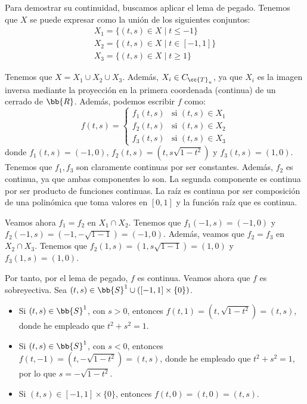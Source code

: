 \documentclass[12pt]{article}
\newcommand{\T}[0]{\cc{T}}
\begin{document}
\begin{ejercicio}[3 puntos]
\begin{enumerate}
            Para demostrar su continuidad, buscamos aplicar el lema de pegado. Tenemos que $X$ se puede expresar como la unión de los siguientes conjuntos:
            \begin{equation*}
                    \begin{array}{l}
                        X_1 = \{(t,s)\in X\mid t\leq -1\} \\
                        X_2 = \{(t,s)\in X\mid t\in [-1,1]\} \\
                        X_3 = \{(t,s)\in X\mid t\geq 1\}
                    \end{array}
            \end{equation*}

            Tenemos que $X=X_1\cup X_2\cup X_3$. Además, $X_i\in C_{\T_u}$, ya que $X_i$ es la imagen inversa mediante la proyección en la primera coordenada (continua) de un cerrado de $\bb{R}$.
            Además, podemos escribir $f$ como:
            \begin{equation*}
                f(t,s) = \left\{
                    \begin{array}{ll}
                        f_1(t,s) & \text{si } (t,s)\in X_1 \\
                        f_2(t,s) & \text{si } (t,s)\in X_2 \\
                        f_3(t,s) & \text{si } (t,s)\in X_3
                    \end{array}
                \right.
            \end{equation*}
            donde $f_1(t,s)=(-1,0)$, $f_2(t,s)=(t,s\sqrt{1-t^2})$ y $f_3(t,s)=(1,0)$.
            Tenemos que $f_1,f_3$ son claramente continuas por ser constantes.
            Además, $f_2$ es continua, ya que ambas componentes lo son. La segunda componente es continua por
            ser producto de funciones continuas. La raíz es continua por ser composición de
            una polinómica que toma valores en $[0,1]$ y la función raíz que es continua.

            Veamos ahora $f_1=f_2$ en $X_1\cap X_2$. Tenemos que $f_1(-1,s)=(-1,0)$ y $f_2(-1,s)=(-1,-\sqrt{1-1})=(-1,0)$.
            Además, veamos que $f_2=f_3$ en $X_2\cap X_3$. Tenemos que $f_2(1,s)=(1,s\sqrt{1-1})=(1,0)$ y $f_3(1,s)=(1,0)$.

            Por tanto, por el lema de pegado, $f$ es continua. Veamos ahora que $f$ es sobreyectiva. Sea $(t,s)\in \bb{S}^1 \cup ([-1,1]\times \{0\})$.
            \begin{itemize}
                \item Si $(t,s)\in \bb{S}^1$, con $s>0$, entonces $f(t,1) = (t, \sqrt{1-t^2}) = (t,s)$, donde he empleado que $t^2+s^2=1$.
                \item Si $(t,s)\in \bb{S}^1$, con $s<0$, entonces $f(t,-1) = (t, -\sqrt{1-t^2}) = (t,s)$, donde he empleado que $t^2+s^2=1$, por lo que $s=-\sqrt{1-t^2}$.
                \item Si $(t,s)\in [-1,1]\times \{0\}$, entonces $f(t,0) = (t, 0) = (t,s)$.
            \end{itemize}


\end{enumerate}
\end{ejercicio}
\end{document}
